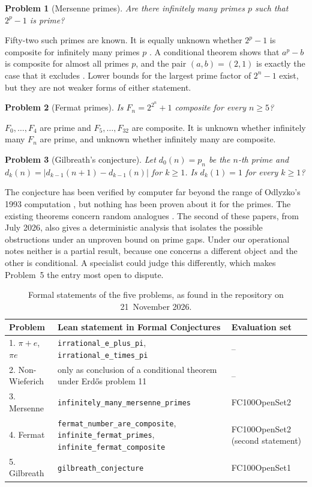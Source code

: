 \documentclass[11pt,a4paper]{article}
\theoremstyle{prob}
\newtheorem{problem}{Problem}
\begin{document}
\begin{problem}[Mersenne primes]
Are there infinitely many primes $p$ such that $2^p-1$ is prime?
\end{problem}
\noindent Fifty-two such primes are known. It is equally unknown whether $2^p-1$ is composite for infinitely many primes $p$ \cite{mersennewiki}. A conditional theorem shows that $a^p-b$ is composite for almost all primes $p$, and the pair $(a,b)=(2,1)$ is exactly the case that it excludes \cite{jt}. Lower bounds for the largest prime factor of $2^n-1$ exist, but they are not weaker forms of either statement.

\begin{problem}[Fermat primes]
Is $F_n=2^{2^n}+1$ composite for every $n\ge 5$?
\end{problem}
\noindent $F_0,\dots,F_4$ are prime and $F_5,\dots,F_{32}$ are composite. It is unknown whether infinitely many $F_n$ are prime, and unknown whether infinitely many are composite.

\begin{problem}[Gilbreath's conjecture]
Let $d_0(n)=p_n$ be the $n$-th prime and $d_k(n)=\lvert d_{k-1}(n+1)-d_{k-1}(n)\rvert$ for $k\ge1$. Is $d_k(1)=1$ for every $k\ge 1$?
\end{problem}
\noindent The conjecture has been verified by computer far beyond the range of Odlyzko's 1993 computation \cite{odlyzko}, but nothing has been proven about it for the primes. The existing theorems concern random analogues \cite{chase,cht}. The second of these papers, from July 2026, also gives a deterministic analysis that isolates the possible obstructions under an unproven bound on prime gaps. Under our operational notes neither is a partial result, because one concerns a different object and the other is conditional. A specialist could judge this differently, which makes Problem~5 the entry most open to dispute.

\begin{table}[!htb]
\centering\footnotesize
\begin{tabularx}{\textwidth}{L{2.6cm} L{6.6cm} Y}
\toprule
Problem & Lean statement in Formal Conjectures \cite{fc} & Evaluation set\\
. $\pi+e$, $\pi e$ & \texttt{irrational\_e\_plus\_pi}, \texttt{irrational\_e\_times\_pi} & --\\
2. Non-Wieferich & only as conclusion of a conditional theorem under Erd\H{o}s problem 11 & --\\
3. Mersenne & \texttt{infinitely\_many\_mersenne\_primes} & FC100OpenSet2\\
4. Fermat & \texttt{fermat\_number\_are\_composite}, \texttt{infinite\_fermat\_primes}, \texttt{infinite\_fermat\_composite} & FC100OpenSet2 (second statement)\\
5. Gilbreath & \texttt{gilbreath\_conjecture} & FC100OpenSet1\\
\bottomrule
\end{tabularx}
\caption{Formal statements of the five problems, as found in the repository on 21~November 2026.}\label{tab:final}
\end{table}
\end{document}
